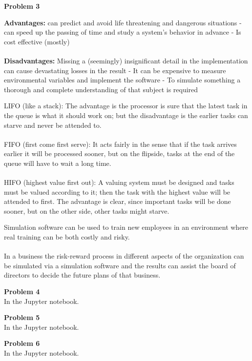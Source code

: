 \documentclass{article}
\newenvironment{problem}[2][Problem]
    { \begin{mdframed}[backgroundcolor=gray!20] \textbf{#1 #2} \\}
    {  \end{mdframed}}
\begin{document}
    \begin{problem}{3}
    	\begin{section}{}
    		\noindent \textbf{Advantages: }can predict and avoid life threatening and dangerous 
    		situations - can speed up the passing of time and study a system's behavior in advance - 
    		Is cost effective (mostly)\\ \\
    		\textbf{Disadvantages: }Missing a (seemingly) insignificant detail in the 
    		implementation can cause devastating losses in the result - It can be expensive to 						measure environmental variables and implement the software - To simulate something 
    		a thorough and complete understanding of that subject is required
    	\end{section}
    	\begin{section}{}
    		\noindent
    		LIFO (like a stack): The advantage is the processor is sure that 
    		the latest task in the queue is what it should work on; but the disadvantage is
    		the earlier tasks can starve and never be attended to.\\ \\
    		FIFO (first come first serve): It acts fairly in the sense that if the task arrives
    		earlier it will be processed sooner, but on the flipside, tasks at the end of the queue
    		will have to wait a long time.\\ \\
    		HIFO (highest value first out): A valuing system must be designed and tasks
    		must be valued according to it; then the task with the highest value will 
    		be attended to first. The advantage is clear, since important tasks
    		will be done sooner, but on the other side, other tasks might starve.
    	\end{section}
    	\begin{section}{}
    	 	\noindent
    	 	Simulation software can be used to train new employees in an environment where
    	 	real training can be both costly and risky.\\ \\
    	 	In a business the risk-reward process in different aspects of the organization can
    	 	be simulated via a simulation software and the results can assist the board of directors
    	 	to decide the future plans of that business.
    	\end{section}
    \end{problem}
    \begin{problem}{4}
    	In the Jupyter notebook.
    \end{problem}
    \begin{problem}{5}
        In the Jupyter notebook.
    \end{problem}
    \begin{problem}{6}
        In the Jupyter notebook.
    \end{problem}
\end{document}
